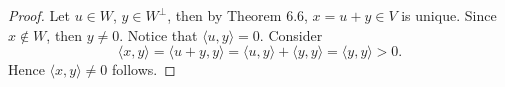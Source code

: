 \begin{Exercise}
\begin{proof}
Let $u\in W$, $y\in W^{\perp}$, then by Theorem 6.6, $x = u+y\in V$ is unique. Since $x\notin W$, then $y\neq 0$. Notice that $\langle u,y \rangle = 0$. Consider
$$
\langle x,y \rangle
= \langle u+y, y \rangle
= \langle u,y \rangle + \langle y,y \rangle
= \langle y,y \rangle
> 0.
$$
Hence $\langle x,y \rangle \neq 0$ follows.
\end{proof}
\end{Exercise}